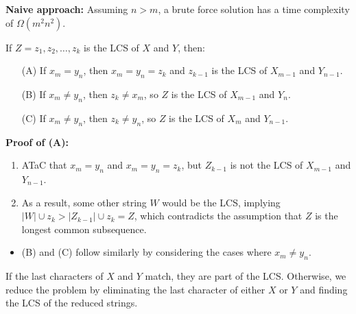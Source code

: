 \begin{intuition}
    \textbf{Naive approach:} Assuming \(n > m\), a brute force solution has a time complexity of \(\Omega(m^2 n^2)\).
\end{intuition}

\begin{theorem}
If \(Z = z_1, z_2, \dots, z_k\) is the LCS of \(X\) and \(Y\), then:
\begin{itemize}
    \item[(A)] If \(x_m = y_n\), then \(x_m = y_n = z_k\) and \(z_{k-1}\) is the LCS of \(X_{m-1}\) and \(Y_{n-1}\).
    \item[(B)] If \(x_m \neq y_n\), then \(z_k \neq x_m\), so \(Z\) is the LCS of \(X_{m-1}\) and \(Y_n\).
    \item[(C)] If \(x_m \neq y_n\), then \(z_k \neq y_n\), so \(Z\) is the LCS of \(X_m\) and \(Y_{n-1}\).
\end{itemize}
\end{theorem}

\begin{derivation}
    \textbf{Proof of (A):}
    \begin{enumerate}
        \item ATaC that \(x_m = y_n\) and \(x_m = y_n = z_k\), but \(Z_{k-1}\) is not the LCS of \(X_{m-1}\) and \(Y_{n-1}\). 
        \item As a result, some other string \(W\) would be the LCS, implying \(|W| \cup z_k > |Z_{k-1}| \cup z_k = Z\), which contradicts the assumption that \(Z\) is the longest common subsequence. 
    \end{enumerate}
    \begin{itemize}
        \item (B) and (C) follow similarly by considering the cases where \(x_m \neq y_n\).
    \end{itemize}
\end{derivation}

\begin{intuition}
If the last characters of \(X\) and \(Y\) match, they are part of the LCS. Otherwise, we reduce the problem by eliminating the last character of either \(X\) or \(Y\) and finding the LCS of the reduced strings.
\end{intuition}

